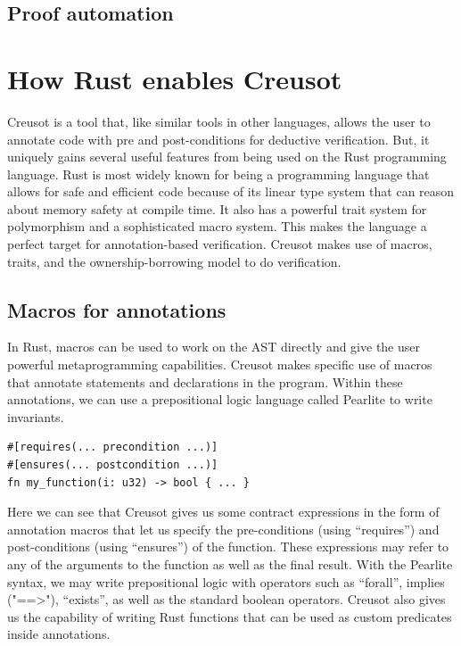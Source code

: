 \documentclass[12pt]{article}
\begin{document}
\subsection{Proof automation}


\section{How Rust enables Creusot}


Creusot is a tool that, like similar tools in other languages, allows the user to annotate code with pre and post-conditions for deductive verification.
But, it uniquely gains several useful features from being used on the Rust programming language. 
Rust is most widely known for being a programming language that allows for safe and efficient code because of its linear type system that can reason about memory safety at compile time. 
It also has a powerful trait system for polymorphism and a sophisticated macro system. 
This makes the language a perfect target for annotation-based verification. 
Creusot makes use of macros, traits, and the ownership-borrowing model to do verification. 

\subsection{Macros for annotations}
In Rust, macros can be used to work on the AST directly and give the user powerful metaprogramming capabilities. 
Creusot makes specific use of macros that annotate statements and declarations in the program. 
Within these annotations, we can use a prepositional logic language called Pearlite to write invariants. 
\begin{verbatim}
#[requires(... precondition ...)]
#[ensures(... postcondition ...)]
fn my_function(i: u32) -> bool { ... }
\end{verbatim}

Here we can see that Creusot gives us some contract expressions in the form of annotation macros that let us specify the pre-conditions (using ``requires'') and post-conditions (using ``ensures'') of the function. 
These expressions may refer to any of the arguments to the function as well as the final result. 
With the Pearlite syntax, we may write prepositional logic with operators such as ``forall'', implies ("==>"), ``exists'', as well as the standard boolean operators. 
Creusot also gives us the capability of writing Rust functions that can be used as custom predicates inside annotations. 
\end{document}
